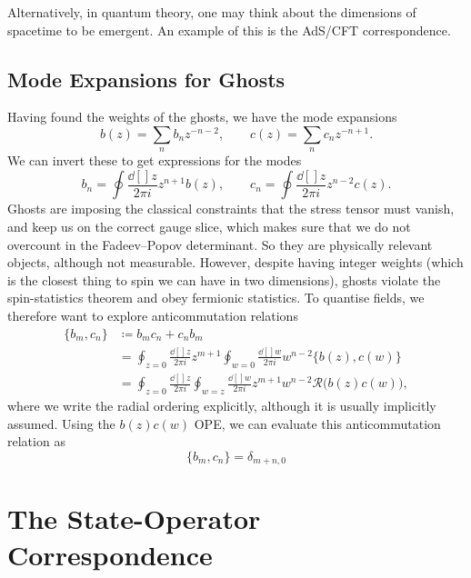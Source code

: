 Alternatively, in quantum theory, one may think about the dimensions of spacetime to be emergent.
An example of this is the AdS/CFT correspondence.

\subsection{Mode Expansions for Ghosts}%
\label{sub:mode_expansions_for_ghosts}

Having found the weights of the ghosts, we have the mode expansions
\begin{equation}
  b(z) = \sum_n b_n z^{-n - 2}, \qquad c(z) = \sum_n c_n z^{-n +1}.
\end{equation}
We can invert these to get expressions for the modes
\begin{equation}
  b_n = \oint \frac{\dd[]{z}}{2 \pi i} z^{n+1} b(z), \qquad c_n = \oint \frac{\dd[]{z}}{2 \pi i} z^{n-2} c(z).
\end{equation}
Ghosts are imposing the classical constraints that the stress tensor must vanish, and keep us on the correct gauge slice, which makes sure that we do not overcount in the Fadeev--Popov determinant.
So they are physically relevant objects, although not measurable.
However, despite having integer weights (which is the closest thing to spin we can have in two dimensions), ghosts violate the spin-statistics theorem and obey fermionic statistics.
To quantise fields, we therefore want to explore anticommutation relations
\begin{align}
  \{b_m, c_n\} &\coloneqq b_m c_n + c_n b_m \\
	       &= \oint_{z = 0} \frac{\dd[]{z}}{2\pi i} z^{m+1} \oint_{w  =0} \frac{\dd[]{w}}{2 \pi i} w^{n-2} \{b(z), c(w)\} \\
	       &= \oint_{z = 0} \frac{\dd[]{z}}{2\pi i } \oint_{w = z} \frac{\dd[]{w}}{2 \pi i} z^{m+1} w^{n-2} \mathcal{R} \big( b(z) c(w) \big),
\end{align}
where we write the radial ordering explicitly, although it is usually implicitly assumed.
Using the $b(z) c(w)$ OPE, we can evaluate this anticommutation relation as
\begin{equation}
  \boxed{ \{b_m, c_n\} = \delta_{m+n, 0} }
\end{equation}

\section{The State-Operator Correspondence}%
\label{sec:the_state_operator_correspondence}

